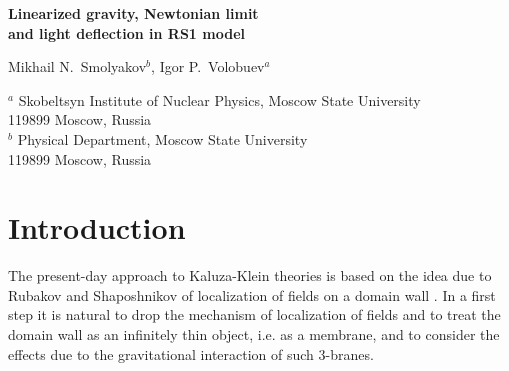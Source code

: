 \documentclass[a4paper,12pt]{article}
\begin{document}
\vspace{1cm}
\begin{center}
{\Large \bf Linearized gravity, Newtonian limit\\ and light
deflection in RS1 model}\\

\vspace{4mm}


Mikhail N.~Smolyakov$^b$, Igor P.~Volobuev$^a$\\

\vspace{4mm}

$^a$ Skobeltsyn Institute of Nuclear Physics, Moscow State
University
\\ 119899 Moscow, Russia \\
$^b$ Physical Department, Moscow State University \\ 119899
Moscow, Russia \\

\end{center}



\begin{abstract}
We solve exactly the equations of motion for linearized gravity in
the Randall-Sundrum model with matter on the branes and calculate
the Newtonian limit in it. The result contains contributions of
the radion and  of the massive modes, which change considerably
Newton's law at small distances. The effects of "shadow"\ matter,
which lives on the other brane, are considered and compared with
those of ordinary matter for both positive and negative tension
branes. We also calculate light deflection and Newton's law in the
zero mode approximation and explicitly distinguish the
contribution of the radion field. \\[0.3cm] Keywords: Kaluza-Klein
theories; branes;  linearized gravity; Newtonian limit
\end{abstract}


\section{Introduction}

The present-day approach to Kaluza-Klein  theories is based on the
idea due to Rubakov and Shaposhnikov of localization of fields on
a domain wall \cite{RSH,RSH1}. In a first step it is natural to
drop the mechanism of localization of fields and to treat the
domain wall as an infinitely thin object, i.e. as a membrane, and
to consider the effects due to the gravitational interaction of
such 3-branes.
\end{document}
